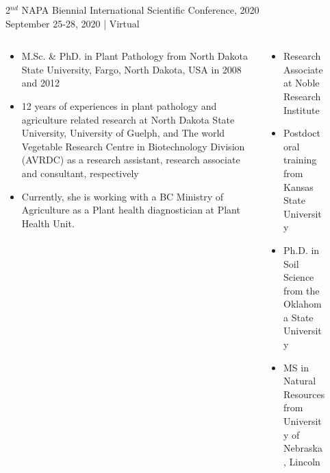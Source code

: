 \documentclass[dvipsnames,usenames]{beamer}
\begin{document}
\begin{frame}[plain,t]{\vskip2mm
2$^{nd}$ NAPA Biennial International Scientific Conference, 2020 \\[1cm]
September 25-28, 2020 | Virtual \\[1cm]}
\begin{block}
\begin{columns}
\end{columns}

\vspace{1cm}

\begin{columns}
\centering
\begin{column}{0.22\textwidth}
\begin{figure}
    \centering
\end{figure}
\begin{itemize}
\item M.Sc. \& PhD. in Plant Pathology from North Dakota State University, Fargo, North Dakota, USA in 2008 and 2012
\item 12 years of experiences in plant pathology and agriculture related research at North Dakota State University, University of Guelph, and The world Vegetable Research Centre in Biotechnology Division (AVRDC) as a research assistant, research associate and consultant, respectively
\item Currently, she is working with a BC Ministry of Agriculture as a Plant health diagnostician at Plant Health Unit.
\end{itemize}
\end{column}

\begin{column}{0.25\textwidth}
\begin{figure}
    \centering
\end{figure}
\begin{itemize}
\item Research Associate at Noble Research Institute
\item Postdoctoral training from Kansas State University
\item Ph.D. in Soil Science from the Oklahoma State University
\item MS in Natural Resources from University of Nebraska, Lincoln
\end{itemize}
\end{column}

\begin{column}{0.22\textwidth}
\begin{figure}
    \centering
\end{figure}


\end{column}
\end{columns}
\end{block}
\end{frame}
\end{document}

